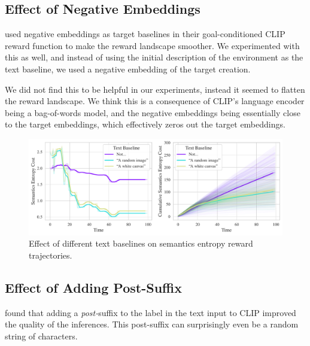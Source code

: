 

\subsection{Effect of Negative Embeddings}
\label{sec:negative-embeddings}
\cite{negprompt} used negative embeddings as target baselines in their goal-conditioned CLIP reward function to make the reward landscape smoother.
We experimented with this as well, and instead of using the initial description of the environment as the text baseline, we used a negative embedding of the target creation.

We did not find this to be helpful in our experiments, instead it seemed to flatten the reward landscape.
We think this is a consequence of CLIP's language encoder being a bag-of-words model, and the negative embeddings being essentially close to the target embeddings, which effectively zeros out the target embeddings.

\begin{figure}[h]
    \centering
    \includegraphics[width=\textwidth]{images/baseline_comparison.pdf}
    \caption{Effect of different text baselines on semantics entropy reward trajectories.}
    \label{fig:baseline}
\end{figure}

\subsection{Effect of Adding Post-Suffix}
\label{sec:post-suffix}
\cite{waffleclip} found that adding a \emph{post-}suffix to the label in the text input to CLIP improved the quality of the inferences.
This post-suffix can surprisingly even be a random string of characters.

